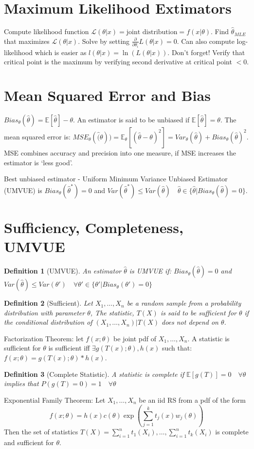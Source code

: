 \documentclass[10pt]{article}
\newtheorem{definition}{Definition}[section]
\begin{document}
\section{Maximum Likelihood Extimators}
Compute likelihood function $\mathcal{L}(\theta | x) = \text{joint distribution} = f(x | \theta)$.
Find $\hat{\theta}_{MLE}$ that maximizes $\mathcal{L}(\theta | x)$. 
Solve by setting $\frac{\partial }{ \partial \theta_i} L(\theta | x) = 0$.
Can also compute log-likelihood which is easier as $l(\theta | x) = \ln (L(\theta | x))$.
Don't forget! Verify that critical point is the maximum by verifying second derivative at critical point $< 0$.

\section{Mean Squared Error and Bias}
$Bias_\theta(\hat{\theta}) = \mathbb{E}[\hat{\theta}] - \theta$.
An estimator is said to be unbiased if $\mathbb{E}[\hat{\theta}] = \theta$.
The mean squared error is: 
$MSE_\theta(\hat(\theta)) = \mathbb{E}_\theta[(\hat{\theta} - \theta)^2] = Var_\theta(\hat{\theta}) + Bias_\theta(\hat{\theta})^2$.
MSE combines accuracy and precision into one measure, if MSE increases the estimator is `less good'.

Best unbiased estimator - Uniform Minimum Variance Unbiased Estimator (UMVUE) is $Bias_\theta (\hat{\theta}^*) = 0$ and 
$Var(\hat{\theta}^*) \leq Var(\hat{\theta}) \quad \hat{\theta} \in \{ \hat{\theta} | Bias_\theta(\hat{\theta}) = 0 \}$.


\section{Sufficiency, Completeness, UMVUE}
\begin{definition}[UMVUE]
    An estimator $\hat{\theta}$ is UMVUE if: 
    $Bias_\theta(\hat{\theta}) = 0$ and 
    $Var(\hat{\theta}) \leq Var(\theta') \quad \forall \theta' \in \{\theta' | Bias_\theta(\theta') = 0\}$
\end{definition}
\begin{definition} [Sufficient]
    Let $X_1, \dots, X_n$ be a random sample from a probability distribution with parameter $\theta$,
    The statistic, $T(X)$ is said to be sufficient for $\theta$ if the conditional distribution of $(X_1, \dots, X_n) | T(X)$
    does not depend on $\theta$.
\end{definition}
Factorization Theorem: let $f(x; \theta)$ be joint pdf of $X_1, \dots, X_n$. 
A statistic is sufficient for $\theta$ is sufficient iff $\exists g(T(x); \theta), h(x)$ such that:
$f(x; \theta) = g(T(x) ; \theta) * h(x)$. 
\begin{definition}[Complete Statistic]
    A statistic is complete if $\mathbb{E}[g(T)] = 0 \quad \forall \theta$ implies that $P(g(T) = 0) = 1 \quad \forall \theta$
\end{definition}
Exponential Family Theorem: Let $X_1, \dots, X_n$ be an iid RS from a pdf of the form
$$f(x;\theta) = h(x) c(\theta) \exp \left( \sum_{j=1}^k t_j(x) w_j(\theta) \right)$$
Then the set of statistics $T(X) = \sum_{i=1}^n t_1(X_i), \dots, \sum_{i=1}^n t_k(X_i)$ is complete and sufficient for $\theta$.
\end{document}
